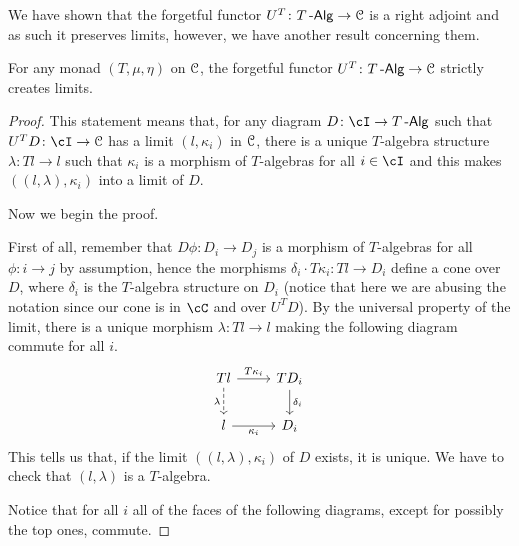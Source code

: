 \documentclass[a4paper,11pt,oneside,openany]{scrbook}
\begin{document}
We have shown that the forgetful functor $U^T\colon T\operatorname{-\mathsf{Alg}}\rightarrow\operatorname{\mathcal{C}}$ is a
right adjoint and as such it preserves limits, however, we have another result
concerning them.

\begin{prop}\label{create lims}
	For any monad $(T,\mu,\eta)$ on $\operatorname{\mathcal{C}}$, the forgetful functor $U^T\colon T\operatorname{-\mathsf{Alg}}\rightarrow\operatorname{\mathcal{C}}$ strictly creates limits.
\end{prop}

\begin{proof}
	This statement means that, for any diagram $D\colon\cI\rightarrow T\Alg$
	such that $U^TD\colon\cI\rightarrow\C$ has a limit $(l,\kappa_i)$ in $\operatorname{\mathcal{C}}$,
	there is a unique $T$-algebra structure $\lambda\colon Tl\rightarrow l$ such
	that $\kappa_i$ is a morphism of $T$-algebras for all $i\in\cI$ and this
	makes $((l,\lambda),\kappa_i)$ into a limit of $D$.

	Now we begin the proof.

	First of all, remember that $D\phi\colon D_i\rightarrow D_j$ is a morphism
	of $T$-algebras for all $\phi\colon i\rightarrow j$ by assumption, hence the
	morphisms $\delta_i\cdot T\kappa_i\colon Tl\rightarrow D_i$ define a cone
	over $D$, where $\delta_i$ is the $T$-algebra structure on $D_i$ (notice
	that here we are abusing the notation since our cone is in $\cC$ and over
	$U^TD$). By the
	universal property of the limit, there is a unique morphism $\lambda\colon
		Tl\rightarrow l$ making the following diagram commute for all $i$.
	\[
		\begin{tikzcd}
			Tl\ar[d, dashed, "\lambda"'] \ar[r, "T\kappa_i"]
			& TD_i\ar[d, "\delta_i"]\\
			l\ar[r, "\kappa_i"']
			& D_i
		\end{tikzcd}
	\]
	This tells us that, if the limit $((l,\lambda),\kappa_i)$ of $D$ exists, it
	is unique. We have to check that $(l,\lambda)$ is a $T$-algebra.

	Notice that for all $i$ all of the faces of the following diagrams, except
	for possibly the top ones, commute.


\end{proof}
\end{document}

